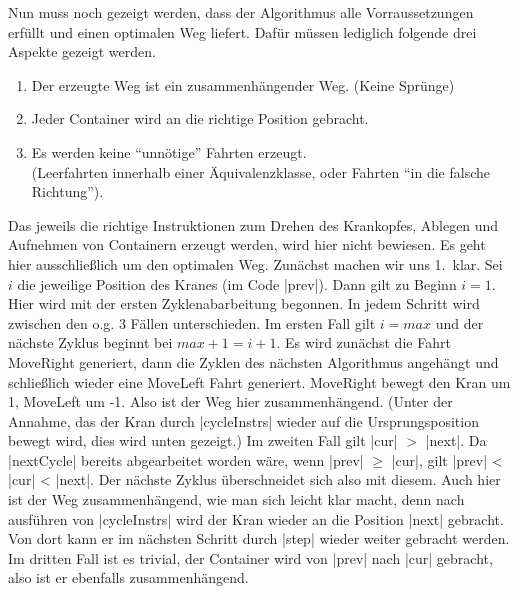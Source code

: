 Nun muss noch gezeigt werden, dass der Algorithmus alle Vorraussetzungen erfüllt und einen optimalen Weg liefert.
Dafür müssen lediglich folgende drei Aspekte gezeigt werden.
\begin{enumerate}
 \item Der erzeugte Weg ist ein zusammenhängender Weg. (Keine Sprünge)
 \item Jeder Container wird an die richtige Position gebracht.
 \item Es werden keine ``unnötige'' Fahrten erzeugt. \\
       (Leerfahrten innerhalb einer Äquivalenzklasse, oder Fahrten ``in die falsche Richtung'').
\end{enumerate}
Das jeweils die richtige Instruktionen zum Drehen des Krankopfes, Ablegen und Aufnehmen von Containern erzeugt werden, wird hier nicht bewiesen.
Es geht hier ausschließlich um den optimalen Weg. Zunächst machen wir uns 1.\ klar. Sei $i$ die jeweilige Position des Kranes (im Code |prev|).
Dann gilt zu Beginn $i = 1$. Hier wird mit der ersten Zyklenabarbeitung begonnen. In jedem Schritt wird zwischen den o.g. 3 Fällen unterschieden.
Im ersten Fall gilt $i=max$ und der nächste Zyklus beginnt bei $max+1=i+1$.
Es wird zunächst die Fahrt MoveRight generiert, dann die Zyklen des nächsten Algorithmus angehängt und schließlich wieder eine MoveLeft Fahrt generiert.
MoveRight bewegt den Kran um 1, MoveLeft um -1. Also ist der Weg hier zusammenhängend.
(Unter der Annahme, das der Kran durch |cycleInstrs| wieder auf die Ursprungsposition bewegt wird, dies wird unten gezeigt.)
Im zweiten Fall gilt |cur| $>$ |next|. Da |nextCycle| bereits abgearbeitet worden wäre, wenn |prev| $\geq$ |cur|, gilt |prev| < |cur| < |next|.
Der nächste Zyklus überschneidet sich also mit diesem.
Auch hier ist der Weg zusammenhängend, wie man sich leicht klar macht, denn nach ausführen von |cycleInstrs| wird der Kran wieder an die Position |next| gebracht.
Von dort kann er im nächsten Schritt durch |step| wieder weiter gebracht werden.
Im dritten Fall ist es trivial, der Container wird von |prev| nach |cur| gebracht, also ist er ebenfalls zusammenhängend.\\

